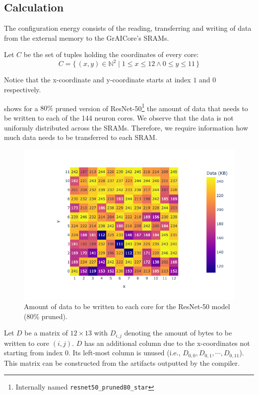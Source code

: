 \subsection{Calculation}
The configuration energy consists of the reading, transferring and writing of data from the external memory to the GrAICore's SRAMs. 

Let $C$ be the set of tuples holding the coordinates of every core:
\begin{equation*}
    C = \{\,\left(x,y\right) \in \mathbb{N}^2 \mid 1 \leq x \leq 12 \wedge 0 \leq y \leq 11 \,\} 
\end{equation*}

Notice that the x-coordinate and y-coordinate starts at index $1$ and $0$ respectively.

 shows for a $80\%$ pruned version of ResNet-50\footnote{Internally named \texttt{resnet50\_pruned80\_star}} the amount of data that needs to be written to each of the 144 neuron cores.
We observe that the data is not uniformly distributed across the SRAMs.
Therefore, we require information how much data needs to be transferred to each SRAM.

\begin{figure}[hbtp]
    \centering
    \includegraphics[width=0.8\linewidth]{assets/model_data_heatmap.png}
    \caption{Amount of data to be written to each core for the ResNet-50 model (80\% pruned).}
    \label{fig:model_data_heapmap}
\end{figure}

Let $D$ be a matrix of $12 \times 13$ with $D_{i,j}$ denoting the amount of bytes to be written to core $\left( i,j \right)$.
$D$ has an additional column due to the x-coordinates not starting from index $0$.
Its left-most column is unused (i.e., $D_{0,0}, D_{0,1}, \cdots, D_{0,11}$).
This matrix can be constructed from the artifacts outputted by the compiler.

